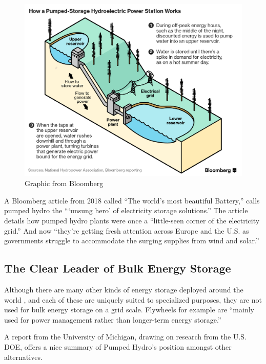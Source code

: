 \documentclass[hidelinks,12pt,a4paper]{article}
\begin{document}
\begin{figure}[ht!]
    \centering
    \includegraphics[width=1\textwidth]{bloomberg-how-pumped-storage-works.png}
    \caption{Graphic from Bloomberg \cite{QuestforBiggerBatteries}}
\end{figure}
\FloatBarrier

A Bloomberg article from 2018 called “The world's most beautiful Battery,” calls pumped hydro the “‘unsung hero’ of electricity storage solutions.” \cite{MostBeautifulBattery} The article details how pumped hydro plants were once a “little-seen corner of the electricity grid.” And now “they’re getting fresh attention across Europe and the U.S. as governments struggle to accommodate the surging supplies from wind and solar.” \cite{MostBeautifulBattery}

\subsection{The Clear Leader of Bulk Energy Storage}
Although there are many other kinds of energy storage deployed around the world \cite{OpenListOfNonPumpedStorageProjects}, and each of these are uniquely suited to specialized purposes, they are not used for bulk energy storage on a grid scale. Flywheels for example are “mainly used for power management rather than longer-term energy storage.” \cite{USGridEnergyStorageFactsheet}

A report from the University of Michigan, drawing on research from the U.S. DOE, offers a nice summary of Pumped Hydro's position amongst other alternatives.
\end{document}
